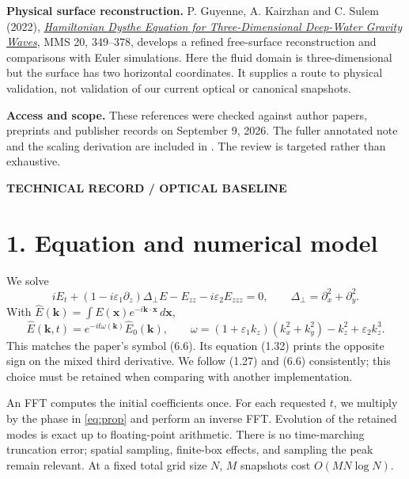 \documentclass[10pt,letterpaper]{article}
\newcommand{\eyebrow}[1]{{\color{teal}\normalsize\bfseries #1}\par}
\begin{document}
\textbf{Physical surface reconstruction.} P. Guyenne, A. Kairzhan and C. Sulem
(2022), \href{https://doi.org/10.1137/21M1432788}{\emph{Hamiltonian Dysthe Equation for
Three-Dimensional Deep-Water Gravity Waves}}, MMS 20, 349--378, develops a refined
free-surface reconstruction and comparisons with Euler simulations. Here the
fluid domain is three-dimensional but the surface has two horizontal coordinates.
It supplies a route to physical validation, not validation of our current optical
or canonical snapshots.

\textbf{Access and scope.} These references were checked against author papers,
preprints and publisher records on September 9, 2026. The fuller annotated note
and the scaling derivation are included in .
The review is targeted rather than exhaustive.
\newpage
{}\label{optical}

\eyebrow{TECHNICAL RECORD / OPTICAL BASELINE}
\section*{1. Equation and numerical model}
We solve
\begin{equation}
 iE_t+(1-i\varepsilon_1\partial_z)\Delta_\perp E-E_{zz}
       -i\varepsilon_2 E_{zzz}=0,
 \qquad \Delta_\perp=\partial_x^2+\partial_y^2.
 \label{eq:pde}
\end{equation}
With $\widehat E(\mathbf k)=\int E(\mathbf x)e^{-i\mathbf k\cdot\mathbf x}\,d\mathbf x$,
\begin{equation}
 \widehat E(\mathbf k,t)=e^{-it\omega(\mathbf k)}\widehat E_0(\mathbf k),\qquad
 \omega=(1+\varepsilon_1 k_z)(k_x^2+k_y^2)-k_z^2+\varepsilon_2k_z^3.
 \label{eq:prop}
\end{equation}
This matches the paper's symbol (6.6). Its equation (1.32) prints the opposite sign
on the mixed third derivative. We follow (1.27) and (6.6) consistently; this choice
must be retained when comparing with another implementation.

An FFT computes the initial coefficients once. For each requested $t$, we multiply
by the phase in \eqref{eq:prop} and perform an inverse FFT. Evolution of the retained
modes is exact up to floating-point arithmetic. There is no time-marching truncation
error; spatial sampling, finite-box effects, and sampling the peak remain relevant.
At a fixed total grid size $N$, $M$ snapshots cost $O(MN\log N)$.
\end{document}
